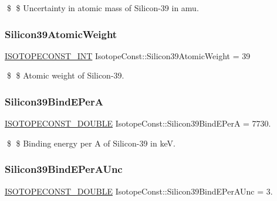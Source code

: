 \$ \$ Uncertainty in atomic mass of Silicon-\/39 in amu. \mbox{\label{group___isotope_const-_silicon-_si39_gaa56a64c6c062e3e3ce66eb0869f595f8}} 
\subsubsection{\texorpdfstring{Silicon39\+Atomic\+Weight}{Silicon39AtomicWeight}}
{\footnotesize\ttfamily \mbox{\hyperlink{group___isotope_const-_macros_ga5f18360b3e99483a35c32d789e62621c}{I\+S\+O\+T\+O\+P\+E\+C\+O\+N\+S\+T\+\_\+\+I\+NT}} Isotope\+Const\+::\+Silicon39\+Atomic\+Weight = 39}

\$ \$ Atomic weight of Silicon-\/39. \mbox{\label{group___isotope_const-_silicon-_si39_ga0c67d67d6f7806c6a8e0a9b860831103}} 
\subsubsection{\texorpdfstring{Silicon39\+Bind\+E\+PerA}{Silicon39BindEPerA}}
{\footnotesize\ttfamily \mbox{\hyperlink{group___isotope_const-_macros_ga8f45a7272ce02c0b4c65c44636ed719a}{I\+S\+O\+T\+O\+P\+E\+C\+O\+N\+S\+T\+\_\+\+D\+O\+U\+B\+LE}} Isotope\+Const\+::\+Silicon39\+Bind\+E\+PerA = 7730.}

\$ \$ Binding energy per A of Silicon-\/39 in keV. \mbox{\label{group___isotope_const-_silicon-_si39_gaadd7ccef814615f3647a091001496f1b}} 
\subsubsection{\texorpdfstring{Silicon39\+Bind\+E\+Per\+A\+Unc}{Silicon39BindEPerAUnc}}
{\footnotesize\ttfamily \mbox{\hyperlink{group___isotope_const-_macros_ga8f45a7272ce02c0b4c65c44636ed719a}{I\+S\+O\+T\+O\+P\+E\+C\+O\+N\+S\+T\+\_\+\+D\+O\+U\+B\+LE}} Isotope\+Const\+::\+Silicon39\+Bind\+E\+Per\+A\+Unc = 3.}

